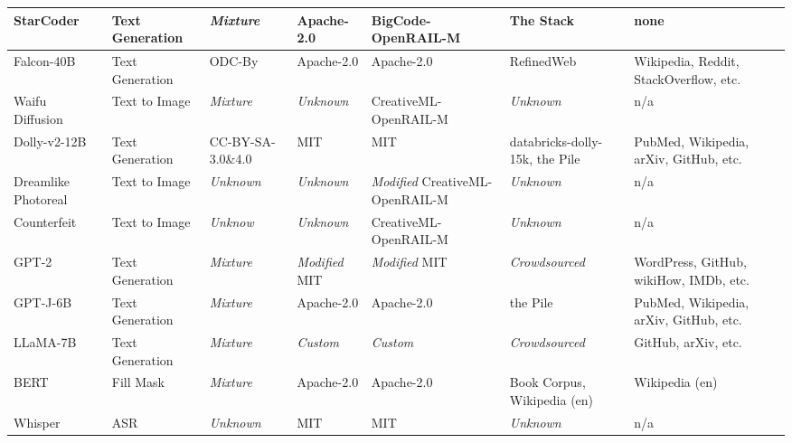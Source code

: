 \begin{table*}[t]
\begin{tabular}{|p{2.1cm}|p{1.6cm}|p{2cm}|p{2.75cm}|p{3cm}|p{1.7cm}|p{2cm}|}
      StarCoder & Text Generation &  \textit{Mixture} & Apache-2.0 & BigCode-OpenRAIL-M & The Stack & none \\ \hline

      Falcon-40B & Text Generation & ODC-By & Apache-2.0 & Apache-2.0 & RefinedWeb & Wikipedia, Reddit, \newline StackOverflow, etc. \\ \hline

      Waifu Diffusion & Text to Image & \textit{Mixture} & \textit{Unknown} & CreativeML-OpenRAIL-M & \textit{Unknown} & n/a \\ \hline

      Dolly-v2-12B & Text Generation & CC-BY-SA-3.0\&4.0 & MIT & MIT & databricks-dolly\newline-15k, the Pile & PubMed,  Wikipedia, \newline arXiv, GitHub, etc. \\ \hline

      Dreamlike Photoreal & Text to Image & \textit{Unknown} & \textit{Unknown} & \textit{Modified} CreativeML-\newline OpenRAIL-M & \textit{Unknown} & n/a \\ \hline

      Counterfeit & Text to Image & \textit{Unknow} & \textit{Unknown} & CreativeML-OpenRAIL-M & \textit{Unknown} & n/a \\ \hline

      GPT-2 & Text Generation & \textit{Mixture} & \textit{Modified} MIT & \textit{Modified} MIT & \textit{Crowdsourced} & WordPress, GitHub, \newline wikiHow, IMDb, etc. \\ \hline

      GPT-J-6B & Text Generation & \textit{Mixture} & Apache-2.0 & Apache-2.0 & the Pile & PubMed,  Wikipedia, \newline arXiv, GitHub, etc. \\ \hline

      LLaMA-7B & Text Generation & \textit{Mixture} & \textit{Custom} & \textit{Custom} & \textit{Crowdsourced} & GitHub, arXiv, etc. \\ \hline

      BERT & Fill Mask & \textit{Mixture} & Apache-2.0 & Apache-2.0 & Book Corpus, \newline Wikipedia (en) & Wikipedia (en) \\ \hline

      Whisper & ASR & \textit{Unknown} & MIT & MIT & \textit{Unknown} & n/a \\ \hline


\end{tabular}
\end{table*}
